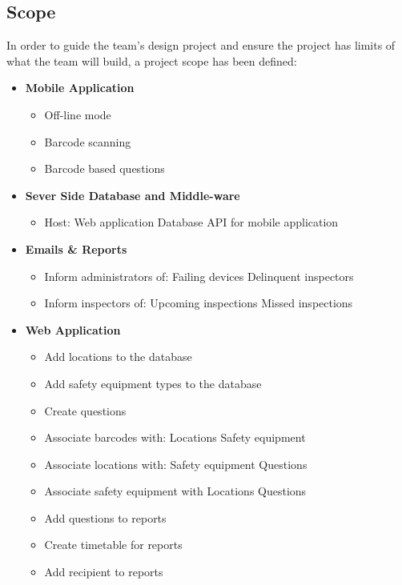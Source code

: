 \documentclass[Letter,11pt]{article}
\begin{document}
	\subsection{Scope}\label{scope}
	In order to guide the team's design project and ensure the project has limits of what the team will build, a project scope has been defined:
	\\
	\begin{minipage}[t]{0.5\textwidth}
		\begin{itemize}
			\item \textbf{Mobile Application}
			\begin{itemize}
				\item Off-line mode
				\item Barcode scanning
				\item Barcode based questions
			\end{itemize}
			\item \textbf{Sever Side Database and Middle-ware}
			\begin{itemize}
				\item Host:
					\subitem Web application
					\subitem Database API for mobile application
			\end{itemize}
			\item\textbf{ Emails \& Reports}
			\begin{itemize}
				\item Inform administrators of:
					\subitem Failing devices
					\subitem Delinquent inspectors
				\item Inform inspectors of:
					\subitem Upcoming inspections
					\subitem Missed inspections
			\end{itemize}
		\end{itemize}
	\end{minipage}
	\begin{minipage}[t]{0.5\textwidth}
		\begin{itemize}
			\item \textbf{Web Application}
				\begin{itemize}
					\item Add locations to the database
					\item Add safety equipment types to the database
					\item Create questions
					\item Associate barcodes with:
						\subitem Locations
						\subitem Safety equipment
					\item Associate locations with:
						\subitem Safety equipment
						\subitem Questions
					\item Associate safety equipment with
						\subitem Locations
						\subitem Questions
					\item Add questions to reports
					\item Create timetable for reports
					\item Add recipient to reports
				\end{itemize}
		\end{itemize}
	\end{minipage}
		
\end{document}
